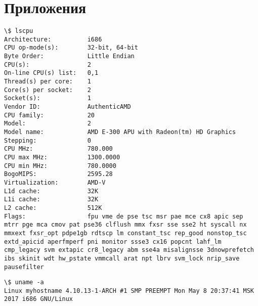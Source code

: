\section{Приложения}







\begin{lstlisting}[caption=\texttt{lscpu}, label=app:lscpu]
\$ lscpu
Architecture:          i686
CPU op-mode(s):        32-bit, 64-bit
Byte Order:            Little Endian
CPU(s):                2
On-line CPU(s) list:   0,1
Thread(s) per core:    1
Core(s) per socket:    2
Socket(s):             1
Vendor ID:             AuthenticAMD
CPU family:            20
Model:                 2
Model name:            AMD E-300 APU with Radeon(tm) HD Graphics
Stepping:              0
CPU MHz:               780.000
CPU max MHz:           1300.0000
CPU min MHz:           780.0000
BogoMIPS:              2595.28
Virtualization:        AMD-V
L1d cache:             32K
L1i cache:             32K
L2 cache:              512K
Flags:                 fpu vme de pse tsc msr pae mce cx8 apic sep mtrr pge mca cmov pat pse36 clflush mmx fxsr sse sse2 ht syscall nx mmxext fxsr_opt pdpe1gb rdtscp lm constant_tsc rep_good nonstop_tsc extd_apicid aperfmperf pni monitor ssse3 cx16 popcnt lahf_lm cmp_legacy svm extapic cr8_legacy abm sse4a misalignsse 3dnowprefetch ibs skinit wdt hw_pstate vmmcall arat npt lbrv svm_lock nrip_save pausefilter
\end{lstlisting}

\begin{lstlisting}[caption=\texttt{uname}, label=app:uname]
\$ uname -a
Linux myhostname 4.10.13-1-ARCH #1 SMP PREEMPT Mon May 8 20:37:41 MSK 2017 i686 GNU/Linux
\end{lstlisting}

\clearpage
